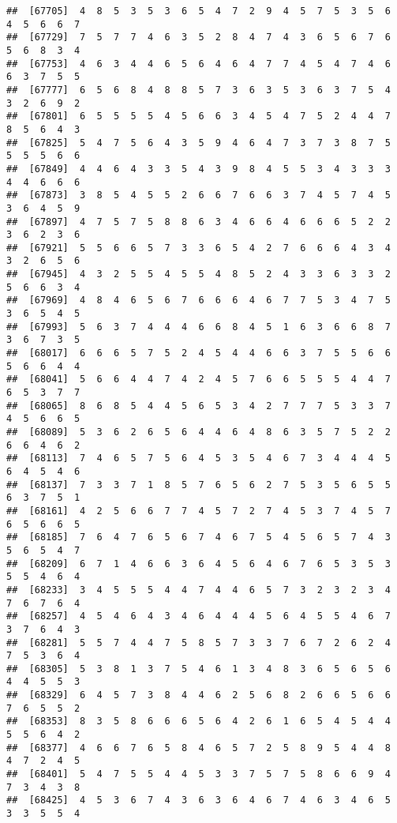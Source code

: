 \documentclass[
]{book}
\begin{document}
\begin{verbatim}
##  [67705]  4  8  5  3  5  3  6  5  4  7  2  9  4  5  7  5  3  5  6  4  5  6  6  7
##  [67729]  7  5  7  7  4  6  3  5  2  8  4  7  4  3  6  5  6  7  6  5  6  8  3  4
##  [67753]  4  6  3  4  4  6  5  6  4  6  4  7  7  4  5  4  7  4  6  6  3  7  5  5
##  [67777]  6  5  6  8  4  8  8  5  7  3  6  3  5  3  6  3  7  5  4  3  2  6  9  2
##  [67801]  6  5  5  5  5  4  5  6  6  3  4  5  4  7  5  2  4  4  7  8  5  6  4  3
##  [67825]  5  4  7  5  6  4  3  5  9  4  6  4  7  3  7  3  8  7  5  5  5  5  6  6
##  [67849]  4  4  6  4  3  3  5  4  3  9  8  4  5  5  3  4  3  3  3  4  4  6  6  6
##  [67873]  3  8  5  4  5  5  2  6  6  7  6  6  3  7  4  5  7  4  5  3  6  4  5  9
##  [67897]  4  7  5  7  5  8  8  6  3  4  6  6  4  6  6  6  5  2  2  3  6  2  3  6
##  [67921]  5  5  6  6  5  7  3  3  6  5  4  2  7  6  6  6  4  3  4  3  2  6  5  6
##  [67945]  4  3  2  5  5  4  5  5  4  8  5  2  4  3  3  6  3  3  2  5  6  6  3  4
##  [67969]  4  8  4  6  5  6  7  6  6  6  4  6  7  7  5  3  4  7  5  3  6  5  4  5
##  [67993]  5  6  3  7  4  4  4  6  6  8  4  5  1  6  3  6  6  8  7  3  6  7  3  5
##  [68017]  6  6  6  5  7  5  2  4  5  4  4  6  6  3  7  5  5  6  6  5  6  6  4  4
##  [68041]  5  6  6  4  4  7  4  2  4  5  7  6  6  5  5  5  4  4  7  6  5  3  7  7
##  [68065]  8  6  8  5  4  4  5  6  5  3  4  2  7  7  7  5  3  3  7  4  5  6  6  5
##  [68089]  5  3  6  2  6  5  6  4  4  6  4  8  6  3  5  7  5  2  2  6  6  4  6  2
##  [68113]  7  4  6  5  7  5  6  4  5  3  5  4  6  7  3  4  4  4  5  6  4  5  4  6
##  [68137]  7  3  3  7  1  8  5  7  6  5  6  2  7  5  3  5  6  5  5  6  3  7  5  1
##  [68161]  4  2  5  6  6  7  7  4  5  7  2  7  4  5  3  7  4  5  7  6  5  6  6  5
##  [68185]  7  6  4  7  6  5  6  7  4  6  7  5  4  5  6  5  7  4  3  5  6  5  4  7
##  [68209]  6  7  1  4  6  6  3  6  4  5  6  4  6  7  6  5  3  5  3  5  5  4  6  4
##  [68233]  3  4  5  5  5  4  4  7  4  4  6  5  7  3  2  3  2  3  4  7  6  7  6  4
##  [68257]  4  5  4  6  4  3  4  6  4  4  4  5  6  4  5  5  4  6  7  3  7  6  4  3
##  [68281]  5  5  7  4  4  7  5  8  5  7  3  3  7  6  7  2  6  2  4  7  5  3  6  4
##  [68305]  5  3  8  1  3  7  5  4  6  1  3  4  8  3  6  5  6  5  6  4  4  5  5  3
##  [68329]  6  4  5  7  3  8  4  4  6  2  5  6  8  2  6  6  5  6  6  7  6  5  5  2
##  [68353]  8  3  5  8  6  6  6  5  6  4  2  6  1  6  5  4  5  4  4  5  5  6  4  2
##  [68377]  4  6  6  7  6  5  8  4  6  5  7  2  5  8  9  5  4  4  8  4  7  2  4  5
##  [68401]  5  4  7  5  5  4  4  5  3  3  7  5  7  5  8  6  6  9  4  7  3  4  3  8
##  [68425]  4  5  3  6  7  4  3  6  3  6  4  6  7  4  6  3  4  6  5  3  3  5  5  4

\end{verbatim}
\end{document}
